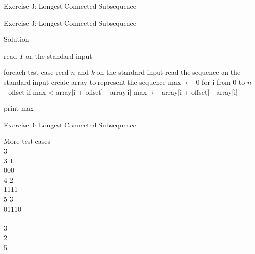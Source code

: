 \documentclass[handout]{beamer}
\begin{document}
\begin{frame}{Exercise 3: Longest Connected Subsequence}
\begin{overlayarea}{\textwidth}{\textheight}
  
  \end{overlayarea}
\end{frame}

\begin{frame}[fragile]{Exercise 3: Longest Connected Subsequence}

  \begin{code}{Solution}
    \begin{PseudoCode}
read $T$ on the standard input

foreach test case
    read $n$ and $k$ on the standard input
    read the sequence on the standard input
    create array to represent the sequence
    max $\leftarrow$ 0
    for i from 0 to $n$ - offset
        if max < array[i + offset] - array[i]
            max $\leftarrow$ array[i + offset] - array[i]

print max
    \end{PseudoCode}
  \end{code}
\end{frame}

\begin{frame}{Exercise 3: Longest Connected Subsequence}

  \begin{exampleblock}{More test cases}
    \\
    3\\3 1\\000\\
    4 2\\1111\\
    5 3\\01110\\
    
    \medskip
    \\
    3\\2\\5
  \end{exampleblock}
\end{frame}
\end{document}
